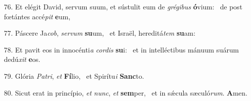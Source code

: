 76. Et elégit David, servum suum, et sústulit eum de \textit{gré}\textit{gi}\textit{bus} \textbf{ó}vium: \ast\  de post fœtántes accé\textit{pit} \textbf{e}um,\

77. Páscere Ja\textit{cob}, \textit{ser}\textit{vum} \textbf{su}um, \ast\  et Israël, hereditá\textit{tem} \textbf{su}am:\

78. Et pavit eos in innocénti\textit{a} \textit{cor}\textit{dis} \textbf{su}i: \ast\  et in intelléctibus mánuum suárum dedú\textit{xit} \textbf{e}os.\

79. Glória \textit{Pa}\textit{tri}, \textit{et} \textbf{Fí}lio, \ast\  et Spirítu\textit{i} \textbf{Sanc}to.\

80. Sicut erat in princípio, \textit{et} \textit{nunc}, \textit{et} \textbf{sem}per, \ast\  et in sǽcula sæculó\textit{rum}. \textbf{A}men.\

